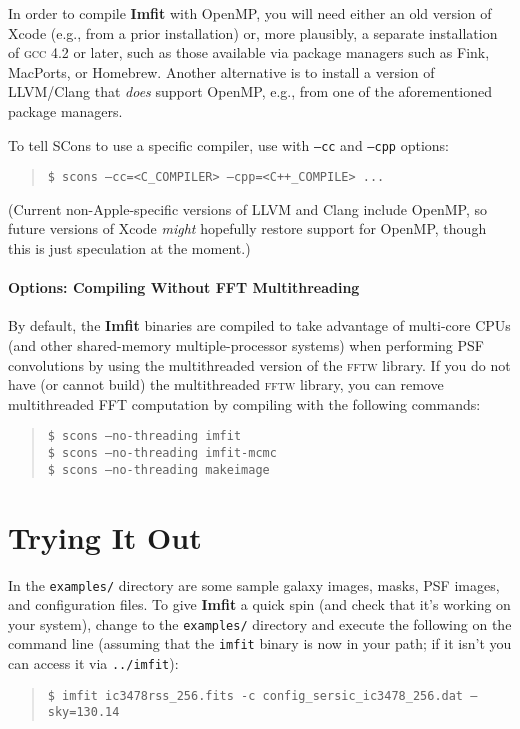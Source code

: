 \documentclass[10pt,a4paper,article]{memoir}
\newcommand{\imfit}{\textbf{Imfit}}
\newcommand{\Imfit}{\textbf{Imfit}}
\newcommand{\imfitprog}{\texttt{imfit}}
\begin{document}
In order to compile \imfit{} with OpenMP, you will need either an
old version of Xcode (e.g., from a prior installation) or, more plausibly, a
separate installation of \textsc{gcc} 4.2 or later, such as those
available via package managers such as Fink, MacPorts, or Homebrew. Another
alternative is to install a version of LLVM/Clang that \textit{does}
support OpenMP, e.g., from one of the aforementioned package managers.

To tell SCons to use a specific compiler, use with \texttt{--cc} and
\texttt{--cpp} options:
\begin{quote}
\texttt{\$ scons --cc=<C\_COMPILER> --cpp=<C++\_COMPILE> ...}
\end{quote}

(Current non-Apple-specific versions of LLVM and Clang include OpenMP, so
future versions of Xcode \textit{might} hopefully restore support for
OpenMP, though this is just speculation at the moment.)



\subsubsection{Options: Compiling Without FFT Multithreading}

By default, the \Imfit{} binaries are compiled to take advantage of multi-core CPUs (and other
shared-memory multiple-processor systems) when performing PSF convolutions by using the 
multithreaded version of the
\textsc{fftw} library. If you do not have (or cannot build) the multithreaded \textsc{fftw} library,
you can remove multithreaded FFT computation by compiling with the following commands:
\begin{quote}
\texttt{\$ scons --no-threading imfit} \\
\texttt{\$ scons --no-threading imfit-mcmc} \\
\texttt{\$ scons --no-threading makeimage}
\end{quote}





\newpage

\chapter{Trying It Out}

In the \texttt{examples/} directory are some sample galaxy images, masks, PSF images, and
configuration files. To give \imfit{} a quick spin (and check that it's working on your system), change to the
\texttt{examples/} directory and execute the following on the command line (assuming that
the \imfitprog{} binary is now in your path; if it isn't you can access it via
\texttt{../imfit}):
\begin{quote}
\texttt{\$ imfit ic3478rss\_256.fits \texttt{-c} config\_sersic\_ic3478\_256.dat \texttt{--}sky=130.14}
\end{quote}
\end{document}
